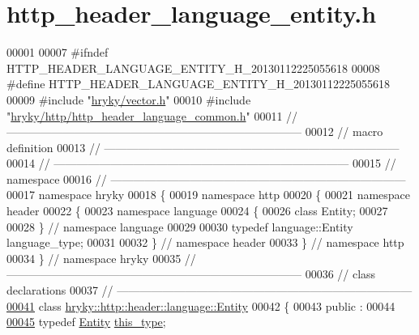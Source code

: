 \hypertarget{http__header__language__entity_8h_source}{\section{http\-\_\-header\-\_\-language\-\_\-entity.\-h}
}

\begin{DoxyCode}
00001 
00007 \textcolor{preprocessor}{#ifndef HTTP\_HEADER\_LANGUAGE\_ENTITY\_H\_20130112225055618}
00008 \textcolor{preprocessor}{}\textcolor{preprocessor}{#define HTTP\_HEADER\_LANGUAGE\_ENTITY\_H\_20130112225055618}
00009 \textcolor{preprocessor}{}\textcolor{preprocessor}{#include "\hyperlink{vector_8h}{hryky/vector.h}"}
00010 \textcolor{preprocessor}{#include "\hyperlink{http__header__language__common_8h}{hryky/http/http_header_language_common.h}"}
00011 \textcolor{comment}{//
      ------------------------------------------------------------------------------}
00012 \textcolor{comment}{// macro definition}
00013 \textcolor{comment}{//
      ------------------------------------------------------------------------------}
00014 \textcolor{comment}{//
      ------------------------------------------------------------------------------}
00015 \textcolor{comment}{// namespace}
00016 \textcolor{comment}{//
      ------------------------------------------------------------------------------}
00017 \textcolor{keyword}{namespace }hryky
00018 \{
00019 \textcolor{keyword}{namespace }http
00020 \{
00021 \textcolor{keyword}{namespace }header
00022 \{
00023 \textcolor{keyword}{namespace }language
00024 \{
00026     \textcolor{keyword}{class }Entity;
00027 
00028 \} \textcolor{comment}{// namespace language}
00029 
00030 \textcolor{keyword}{typedef} language::Entity language\_type;
00031 
00032 \} \textcolor{comment}{// namespace header}
00033 \} \textcolor{comment}{// namespace http}
00034 \} \textcolor{comment}{// namespace hryky}
00035 \textcolor{comment}{//
      ------------------------------------------------------------------------------}
00036 \textcolor{comment}{// class declarations}
00037 \textcolor{comment}{//
      ------------------------------------------------------------------------------}
\hypertarget{http__header__language__entity_8h_source_l00041}{}\hyperlink{classhryky_1_1http_1_1header_1_1language_1_1_entity}{00041} \textcolor{comment}{}\textcolor{keyword}{class }\hyperlink{classhryky_1_1http_1_1header_1_1language_1_1_entity}{hryky::http::header::language::Entity}
00042 \{
00043 \textcolor{keyword}{public} :
00044 
\hypertarget{http__header__language__entity_8h_source_l00045}{}\hyperlink{classhryky_1_1http_1_1header_1_1language_1_1_entity_a363e0d7f532da3d6d3b64751e6ecf72d}{00045}     \textcolor{keyword}{typedef} \hyperlink{classhryky_1_1http_1_1header_1_1language_1_1_entity}{Entity} \hyperlink{classhryky_1_1http_1_1header_1_1language_1_1_entity_a363e0d7f532da3d6d3b64751e6ecf72d}{this_type};

\end{DoxyCode}
